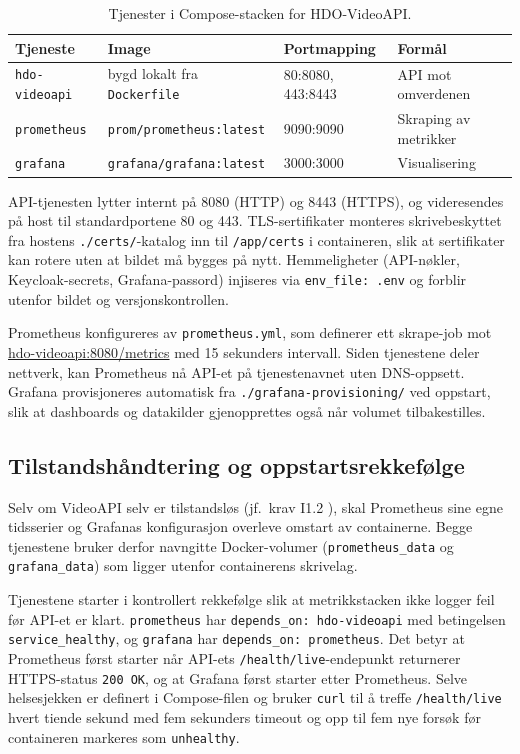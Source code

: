 \begin{table}[h]
\centering
\caption{Tjenester i Compose-stacken for HDO-VideoAPI.}
\label{tab:compose-services}
\begin{tabular}{l l l l}
\toprule
\textbf{Tjeneste} & \textbf{Image} & \textbf{Portmapping} & \textbf{Formål} \\
\midrule
\texttt{hdo-videoapi} & bygd lokalt fra \texttt{Dockerfile} & 80:8080, 443:8443 & API mot omverdenen \\
\texttt{prometheus}   & \texttt{prom/prometheus:latest}     & 9090:9090         & Skraping av metrikker \\
\texttt{grafana}      & \texttt{grafana/grafana:latest}     & 3000:3000         & Visualisering \\
\bottomrule
\end{tabular}
\end{table}

\newpage
API-tjenesten lytter internt på 8080 (HTTP) og 8443 (HTTPS), og videresendes på host til standardportene 80 og 443. TLS-sertifikater monteres skrivebeskyttet fra hostens \texttt{./certs/}-katalog inn til \texttt{/app/certs} i containeren, slik at sertifikater kan rotere uten at bildet må bygges på nytt. Hemmeligheter (API-nøkler, Keycloak-secrets, Grafana-passord) injiseres via \texttt{env\_file: .env} og forblir utenfor bildet og versjonskontrollen.

Prometheus konfigureres av \texttt{prometheus.yml}, som definerer ett skrape-job mot \\ \url{hdo-videoapi:8080/metrics} med 15 sekunders intervall. Siden tjenestene deler nettverk, kan Prometheus nå API-et på tjenestenavnet uten DNS-oppsett. Grafana provisjoneres automatisk fra \texttt{./grafana-provisioning/} ved oppstart, slik at dashboards og datakilder gjenopprettes også når volumet tilbakestilles.

\subsection{Tilstandshåndtering og oppstartsrekkefølge}
\label{subsec:docker-state}

Selv om VideoAPI selv er tilstandsløs (jf.\ krav I1.2 \cite{hdo_kravspec}), skal Prometheus sine egne tidsserier og Grafanas konfigurasjon overleve omstart av containerne. Begge tjenestene bruker derfor navngitte Docker-volumer (\texttt{prometheus\_data} og \texttt{grafana\_data}) som ligger utenfor containerens skrivelag.

Tjenestene starter i kontrollert rekkefølge slik at metrikkstacken ikke logger feil før API-et er klart. \texttt{prometheus} har \texttt{depends\_on: hdo-videoapi} med betingelsen \texttt{service\_healthy}, og \texttt{grafana} har \texttt{depends\_on: prometheus}. Det betyr at Prometheus først starter når API-ets \texttt{/health/live}-endepunkt returnerer HTTPS-status \texttt{200 OK}, og at Grafana først starter etter Prometheus. Selve helsesjekken er definert i Compose-filen og bruker \texttt{curl} til å treffe \texttt{/health/live} hvert tiende sekund med fem sekunders timeout og opp til fem nye forsøk før containeren markeres som \texttt{unhealthy}.

